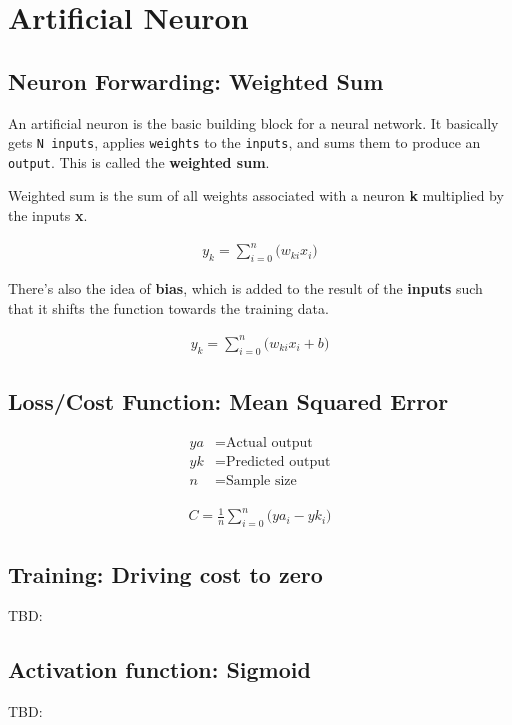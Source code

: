 \documentclass{article}
\begin{document}
\section{Artificial Neuron}

\subsection{Neuron Forwarding: Weighted Sum}
\begin{flushleft}
  An artificial neuron is the basic building block for a neural network. It
  basically gets \texttt{N inputs}, applies \texttt{weights} to the
  \texttt{inputs}, and sums them to produce an \texttt{output}. This is called
  the \textbf{weighted sum}.
\end{flushleft}

\begin{flushleft}
  Weighted sum is the sum of all weights associated with a neuron \textbf{k}
  multiplied by the inputs \textbf{x}.
\end{flushleft}

\begin{equation}
  \begin{align}
    y_k = \sum_{i=0}^{n}{ \bigg( w_{ki} x_i \bigg) }
  \end{align}
\end{equation}

\begin{flushleft}
  There's also the idea of \textbf{bias}, which is added to the result of the
  \textbf{inputs} such that it shifts the function towards the training data.
\end{flushleft}

\begin{equation}
  \begin{align}
    y_k = \sum_{i=0}^{n}{ \bigg( w_{ki} x_i + b \bigg) }
  \end{align}
\end{equation}


\subsection{Loss/Cost Function: Mean Squared Error}
\begin{equation}
  \begin{align}
    ya & = \text{Actual output} \\
    yk & = \text{Predicted output} \\
    n  & = \text{Sample size}
  \end{align}
\end{equation}

\begin{align}
  C = \frac{1}{n} \sum_{i=0}^{n}{ \bigg( ya_{i} - yk_{i} \bigg) }
\end{align}


\subsection{Training: Driving cost to zero}
\begin{flushleft}
  TBD:
\end{flushleft}

\subsection{Activation function: Sigmoid}
\begin{flushleft}
  TBD:
\end{flushleft}
\end{document}
